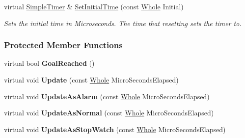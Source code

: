 \begin{DoxyCompactItemize}
virtual \hyperlink{classMezzanine_1_1SimpleTimer}{SimpleTimer} \& \hyperlink{classMezzanine_1_1SimpleTimer_a88f8a89917ab32aa409d6bab5bc4603a}{SetInitialTime} (const \hyperlink{namespaceMezzanine_adcbb6ce6d1eb4379d109e51171e2e493}{Whole} Initial)
\begin{DoxyCompactList}\small\item\em Sets the initial time in Microseconds. The time that resetting sets the timer to. \item\end{DoxyCompactList}\end{DoxyCompactItemize}
\subsubsection*{Protected Member Functions}
\begin{DoxyCompactItemize}
\item 
\hypertarget{classMezzanine_1_1SimpleTimer_a54808aa29afab73aa5cbc397a8ac18b1}{
virtual bool {\bfseries GoalReached} ()}
\label{classMezzanine_1_1SimpleTimer_a54808aa29afab73aa5cbc397a8ac18b1}

\item 
\hypertarget{classMezzanine_1_1SimpleTimer_a382e30e3e07b0db87cddfedcc13706e8}{
virtual void {\bfseries Update} (const \hyperlink{namespaceMezzanine_adcbb6ce6d1eb4379d109e51171e2e493}{Whole} MicroSecondsElapsed)}
\label{classMezzanine_1_1SimpleTimer_a382e30e3e07b0db87cddfedcc13706e8}

\item 
\hypertarget{classMezzanine_1_1SimpleTimer_a6dc58340f18e0966496a57c956aeb855}{
virtual void {\bfseries UpdateAsAlarm} (const \hyperlink{namespaceMezzanine_adcbb6ce6d1eb4379d109e51171e2e493}{Whole} MicroSecondsElapsed)}
\label{classMezzanine_1_1SimpleTimer_a6dc58340f18e0966496a57c956aeb855}

\item 
\hypertarget{classMezzanine_1_1SimpleTimer_a0f16ab0c11ea35b38eb73188d4ace9b4}{
virtual void {\bfseries UpdateAsNormal} (const \hyperlink{namespaceMezzanine_adcbb6ce6d1eb4379d109e51171e2e493}{Whole} MicroSecondsElapsed)}
\label{classMezzanine_1_1SimpleTimer_a0f16ab0c11ea35b38eb73188d4ace9b4}

\item 
\hypertarget{classMezzanine_1_1SimpleTimer_a4b371f7d07acddf9c42964fcf065f4ad}{
virtual void {\bfseries UpdateAsStopWatch} (const \hyperlink{namespaceMezzanine_adcbb6ce6d1eb4379d109e51171e2e493}{Whole} MicroSecondsElapsed)}
\label{classMezzanine_1_1SimpleTimer_a4b371f7d07acddf9c42964fcf065f4ad}

\end{DoxyCompactItemize}
